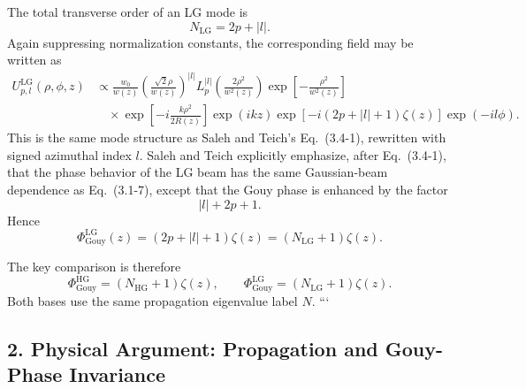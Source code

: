 \begin{resolucao}[Solution]
The total transverse order of an LG mode is
\begin{equation}
    N_{\mathrm{LG}}=2p+|l|.
    \label{eq:NLG_definition}
\end{equation}
Again suppressing normalization constants, the corresponding field may be written as
\begin{equation}
    \begin{aligned}
    U_{p,l}^{\mathrm{LG}}(\rho,\phi,z)
    &\propto
    \frac{w_0}{w(z)}
    \left(
        \frac{\sqrt{2}\rho}{w(z)}
    \right)^{|l|}
    L_p^{|l|}
    \left(
        \frac{2\rho^2}{w^2(z)}
    \right)
    \exp\left[-\frac{\rho^2}{w^2(z)}\right]
    \\[3pt]
    &\quad\times
    \exp\left[-i\frac{k\rho^2}{2R(z)}\right]
    \exp(ikz)
    \exp\left[-i(2p+|l|+1)\zeta(z)\right]
    \exp(-il\phi).
    \end{aligned}
    \label{eq:LG_mode_form}
\end{equation}
This is the same mode structure as Saleh and Teich's Eq.~(3.4-1), rewritten with signed azimuthal index $l$. Saleh and Teich explicitly emphasize, after Eq.~(3.4-1), that the phase behavior of the LG beam has the same Gaussian-beam dependence as Eq.~(3.1-7), except that the Gouy phase is enhanced by the factor
\[
    |l|+2p+1.
\]
Hence
\begin{equation}
    \Phi_{\mathrm{Gouy}}^{\mathrm{LG}}(z)
    =
    (2p+|l|+1)\zeta(z)
    =
    (N_{\mathrm{LG}}+1)\zeta(z).
    \label{eq:LG_gouy_order}
\end{equation}

The key comparison is therefore
\begin{equation}
    \boxed{
    \Phi_{\mathrm{Gouy}}^{\mathrm{HG}}=(N_{\mathrm{HG}}+1)\zeta(z),
    \qquad
    \Phi_{\mathrm{Gouy}}^{\mathrm{LG}}=(N_{\mathrm{LG}}+1)\zeta(z)
    }.
    \label{eq:gouy_comparison}
\end{equation}
Both bases use the same propagation eigenvalue label $N$.
```

\subsection*{2. Physical Argument: Propagation and Gouy-Phase Invariance}


\end{resolucao}

